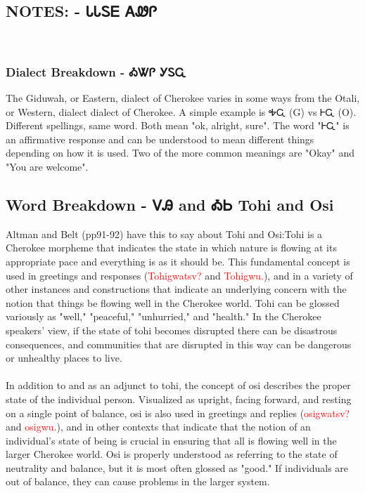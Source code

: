 \begin{multicols}
\chapter{NOTES: - ᏓᏓᏚᎬ ᎪᏪᎵ 
}
\
\subsection{Dialect Breakdown - ᎣᏔᎵ  ᎩᏚᏩ}
The Giduwah, or Eastern, dialect of Cherokee varies in some ways from the Otali, or Western, dialect dialect of Cherokee.  A simple example is ᎭᏩ (G) vs ᎰᏩ (O).  Different spellings, same word.  Both mean "ok, alright, sure".  The word "ᎰᏩ" is an affirmative response and can be understood to mean different things depending on how it is used. Two of the more common meanings are "Okay" and "You are welcome".\cite{joynerlesson4}

\label{sec:wordBreakdownTohiOsi}\section{Word Breakdown - ᏙᎯ and ᎣᏏ Tohi and Osi}Altman and Belt (pp91-92) have this to say about Tohi and Osi:Tohi is a Cherokee morpheme that indicates the state in which nature is flowing at its appropriate pace and everything is as it should be. This fundamental concept is used in greetings and responses (\textcolor{red}{Tohigwatsv?} and \textcolor{red}{Tohigwu.}), and in a variety of other instances and constructions that indicate an underlying concern with the notion that things be flowing well in the Cherokee world. Tohi can be glossed variously as "well," "peaceful," "unhurried," and "health." In the Cherokee speakers' view, if the state of tohi becomes disrupted there can be disastrous consequences, and communities that are disrupted in this way can be dangerous or unhealthy places to live.\\
\\
In addition to and as an adjunct to tohi, the concept of osi describes the proper state of the individual person. Visualized as upright, facing forward, and resting on a single point of balance, osi is also used in greetings and replies (\textcolor{red}{osigwatsv?} and \textcolor{red}{osigwu.}), and in other contexts that indicate that the notion of an individual’s state of being is crucial in ensuring that all is flowing well in the larger Cherokee world. Osi is properly understood as referring to the state of neutrality and balance, but it is most often glossed as "good." If individuals are out of balance, they can cause problems in the larger system.\cite{altmanBelt90-98}


\end{multicols}
